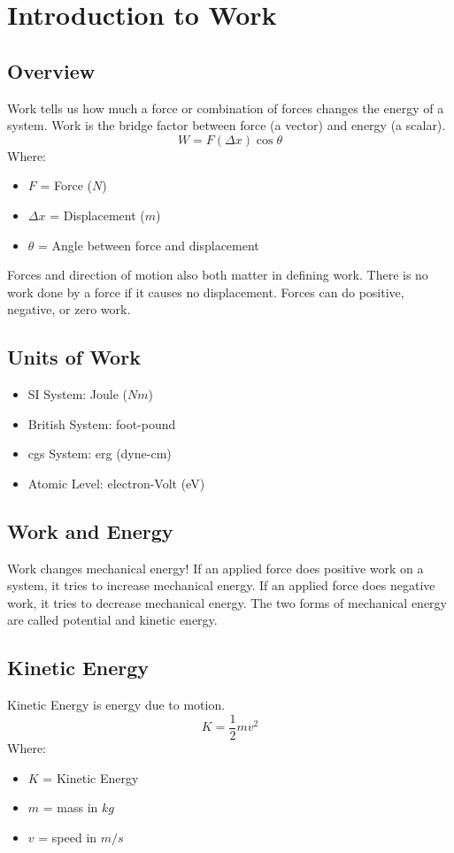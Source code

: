\section{Introduction to Work}

\subsection{Overview}
Work tells us how much a force or combination of forces changes the energy of a system. Work is the bridge factor between force (a vector) and energy (a scalar).
\[W=F(\Delta x)\cos\theta\]
Where:
\begin{itemize}
	\item $F$ = Force ($N$)
	\item $\Delta x$ = Displacement ($m$)
	\item $\theta$ = Angle between force and displacement
\end{itemize}

Forces and direction of motion also both matter in defining work. There is no work done by a force if it causes no displacement. Forces can do positive, negative, or zero work. 

\subsection{Units of Work}
\begin{itemize}
	\item SI System: Joule ($Nm$)
	\item British System: foot-pound
	\item cgs System: erg (dyne-cm)
	\item Atomic Level: electron-Volt (eV)
\end{itemize}

\subsection{Work and Energy}
Work changes mechanical energy! If an applied force does positive work on a system, it tries to increase mechanical energy. If an applied force does negative work, it tries to decrease mechanical energy. The two forms of mechanical energy are called potential and kinetic energy.

\subsection{Kinetic Energy}
Kinetic Energy is energy due to motion. \[K=\frac{1}{2}mv^2\] Where:
\begin{itemize}
	\item $K$ = Kinetic Energy
	\item $m$ = mass in $kg$
	\item $v$ = speed in $m/s$
\end{itemize}

